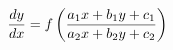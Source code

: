 \documentclass[preview]{standalone}
\begin{document}
\begin{align*}
\special{dvisvgm:raw <g id='unique000'>}\frac{dy}{dx} = f\left( \frac{a_1 x + b_1 y + c_1}{a_2 x + b_2 y + c_2} \right)\special{dvisvgm:raw </g>}
\end{align*}
\end{document}
